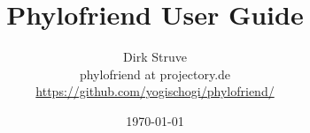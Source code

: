 \begin{titlepage}

\title{Phylofriend User Guide}

\author{Dirk Struve\\
phylofriend at projectory.de\\
\href{https://github.com/yogischogi/phylofriend/}{https://github.com/yogischogi/phylofriend/}}
\date{\today}
\end{titlepage}
\maketitle
